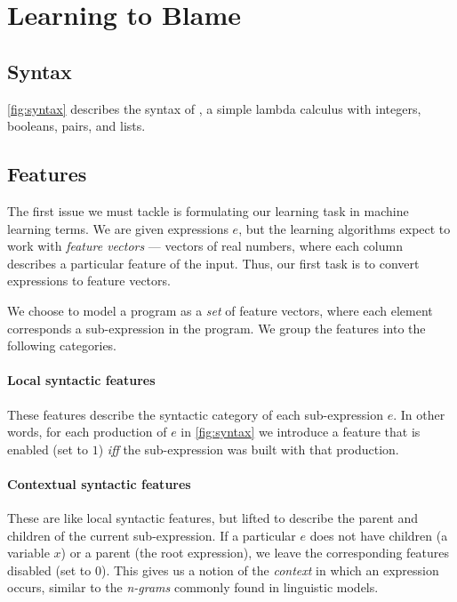 \section{Learning to Blame}
\label{sec:learning}

\subsection{Syntax}
\label{sec:syntax}

%
\autoref{fig:syntax} describes the syntax of \lang, a simple lambda
calculus with integers, booleans, pairs, and lists.

\subsection{Features}
\label{sec:features}
The first issue we must tackle is formulating our learning task in
machine learning terms.
%
We are given expressions $e$, but the learning algorithms expect to work
with \emph{feature vectors} --- vectors of real numbers, where each
column describes a particular feature of the input.
%
Thus, our first task is to convert expressions to feature vectors.

We choose to model a program as a \emph{set} of feature vectors, where
each element corresponds a sub-expression in the program. We group the
features into the following categories.

\paragraph{Local syntactic features}
These features describe the syntactic category of each sub-expression
$e$.
%
In other words, for each production of $e$ in \autoref{fig:syntax} we
introduce a feature that is enabled (set to $1$) \emph{iff} the
sub-expression was built with that production.

\paragraph{Contextual syntactic features}
These are like local syntactic features, but lifted to describe the
parent and children of the current sub-expression.
%
If a particular $e$ does not have children (\eg a variable $x$) or a
parent (\ie the root expression), we leave the corresponding features
disabled (set to $0$).
%
This gives us a notion of the \emph{context} in which an expression
occurs, similar to the \emph{n-grams} commonly found in linguistic
models.

